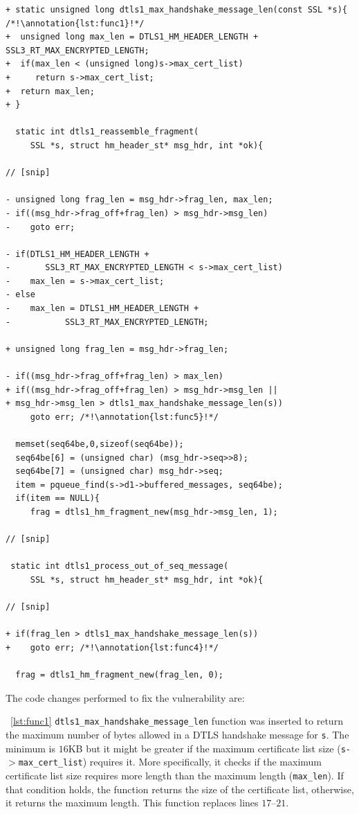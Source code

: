 \documentclass[sigconf,review]{acmart}
\newcounter{lstannotation}
\renewcommand{\thelstannotation}{\ding{\number\numexpr181+\arabic{lstannotation}}}
\newcommand{\annotation}[1]{\refstepcounter{lstannotation}\label{#1}\thelstannotation}
\begin{document}
\medskip
\setcounter{lstannotation}{0}
\begin{lstlisting}[style={CStyle}, caption={Fix provided by OpenSSL developers to the
\\CVE-$2014$-$3506$ vulnerability},label={lst:vuln}]
+ static unsigned long dtls1_max_handshake_message_len(const SSL *s){ /*!\annotation{lst:func1}!*/
+  unsigned long max_len = DTLS1_HM_HEADER_LENGTH + SSL3_RT_MAX_ENCRYPTED_LENGTH;
+  if(max_len < (unsigned long)s->max_cert_list)
+     return s->max_cert_list;
+  return max_len;
+ }

  static int dtls1_reassemble_fragment(
     SSL *s, struct hm_header_st* msg_hdr, int *ok){

// [snip]

- unsigned long frag_len = msg_hdr->frag_len, max_len;
- if((msg_hdr->frag_off+frag_len) > msg_hdr->msg_len)
-    goto err;

- if(DTLS1_HM_HEADER_LENGTH +
-    	SSL3_RT_MAX_ENCRYPTED_LENGTH < s->max_cert_list)
-    max_len = s->max_cert_list;
- else
-    max_len = DTLS1_HM_HEADER_LENGTH +
-   		SSL3_RT_MAX_ENCRYPTED_LENGTH;

+ unsigned long frag_len = msg_hdr->frag_len;

- if((msg_hdr->frag_off+frag_len) > max_len)
+ if((msg_hdr->frag_off+frag_len) > msg_hdr->msg_len ||
+ msg_hdr->msg_len > dtls1_max_handshake_message_len(s))
     goto err; /*!\annotation{lst:func5}!*/

  memset(seq64be,0,sizeof(seq64be));
  seq64be[6] = (unsigned char) (msg_hdr->seq>>8);
  seq64be[7] = (unsigned char) msg_hdr->seq;
  item = pqueue_find(s->d1->buffered_messages, seq64be);
  if(item == NULL){
     frag = dtls1_hm_fragment_new(msg_hdr->msg_len, 1);

// [snip]

 static int dtls1_process_out_of_seq_message(
     SSL *s, struct hm_header_st* msg_hdr, int *ok){

// [snip]

+ if(frag_len > dtls1_max_handshake_message_len(s))
+    goto err; /*!\annotation{lst:func4}!*/

  frag = dtls1_hm_fragment_new(frag_len, 0);

\end{lstlisting}

The code changes performed to fix the vulnerability are:

~\ref{lst:func1} \texttt{dtls1\_max\_handshake\_message\_len} function was
inserted to return the maximum number of bytes allowed in a DTLS
handshake message for \texttt{s}. The minimum is $16$KB but it might be greater if
the maximum certificate list size (\texttt{s-$>$max\_cert\_list}) requires it. More
specifically, it checks if the maximum certificate list size requires more length 
than the maximum length (\texttt{max\_len}). If that condition holds, the function 
returns the size of the certificate list, otherwise, it returns the maximum length. 
This function replaces lines $17$--$21$.
\end{document}
